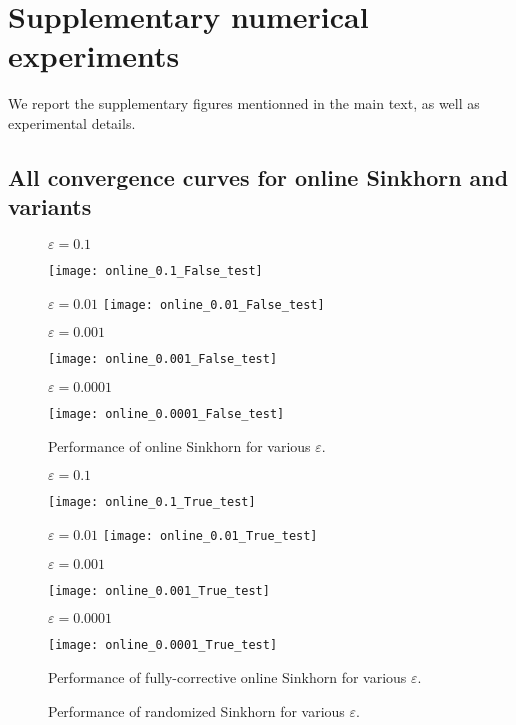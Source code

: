 \pagebreak
\section{Supplementary numerical experiments}

We report the supplementary figures mentionned in the main text, as well as experimental details.

\subsection{All convergence curves for online Sinkhorn and variants}\label{app:online_exp}

\begin{figure}[t]
    \centering
    $\varepsilon = 0.1$

    \texttt{[image: online\_0.1\_False\_test]}
    
    $\varepsilon = 0.01$
    \texttt{[image: online\_0.01\_False\_test]}

    $\varepsilon = 0.001$

    \texttt{[image: online\_0.001\_False\_test]}

    $\varepsilon = 0.0001$

    \texttt{[image: online\_0.0001\_False\_test]}
    \caption{Performance of online Sinkhorn for various $\varepsilon$.}
    \label{fig:convergence_all}
\end{figure}

\begin{figure}[t]
    \centering
    $\varepsilon = 0.1$

    \texttt{[image: online\_0.1\_True\_test]}
    
    $\varepsilon = 0.01$
    \texttt{[image: online\_0.01\_True\_test]}

    $\varepsilon = 0.001$

    \texttt{[image: online\_0.001\_True\_test]}

    $\varepsilon = 0.0001$

    \texttt{[image: online\_0.0001\_True\_test]}
    \caption{Performance of fully-corrective online Sinkhorn for various $\varepsilon$.}
    \label{fig:convergence_refit}
\end{figure}

\begin{figure}[t]
    
    \caption{Performance of randomized Sinkhorn for various $\varepsilon$.}
    \label{fig:convergence_randomized}
\end{figure}

